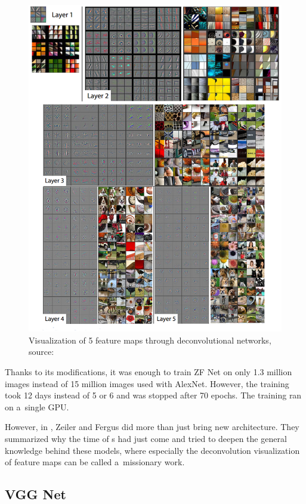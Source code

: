 \begin{figure}[H]
   \centering
	\includegraphics[width=\linewidth]{./pictures/deconvnet.png}
	\caption[Deconvolutional network]{Visualization of 5 feature maps through 
deconvolutional networks, source: \cite{zf-net}}
      \label{fig:deconvnet}
\end{figure}

Thanks to its modifications, it was enough to train ZF Net on only 1.3 million 
images instead of 15 million images used with AlexNet. However, the training 
took 12 days instead of 5 or 6 and was stopped after 70 epochs. The training ran 
on a~single GPU.

However, in \cite{zf-net}, Zeiler and Fergus did more than just bring new 
architecture. They summarized why the time of s had just come and tried 
to deepen the general knowledge behind these models, where especially the 
deconvolution visualization of feature maps can be called a~missionary work.

\subsection{VGG Net}
\label{vgg}

